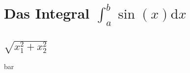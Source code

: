 \documentclass[a5paper]{ttctexa}
\begin{document}
\tableofcontents
\section{Das {Integral $ \int_a^b \sin(x)\mathrm{d}x $}}
\subsection{$\sqrt{x_1^2+x_2^2}$}
bar
\end{document}
